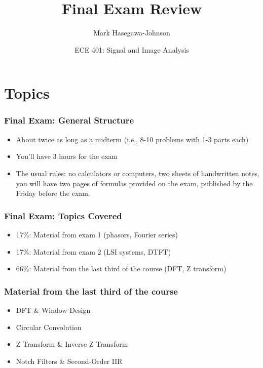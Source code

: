 \documentclass{beamer}
\title{Final Exam Review}
\author{Mark Hasegawa-Johnson}
\date{ECE 401: Signal and Image Analysis}
\begin{document}
\begin{frame}
  \maketitle
\end{frame}

\begin{frame}
  \tableofcontents
\end{frame}


\section{Topics}
\setcounter{subsection}{1}

\begin{frame}
  \frametitle{Final Exam: General Structure}

  \begin{itemize}
  \item About twice as long as a midterm (i.e., 8-10 problems with 1-3 parts each)
  \item You'll have 3 hours for the exam
  \item The usual rules: no calculators or computers, two sheets of
    handwritten notes, you will have two pages of formulas provided on
    the exam, published by the Friday before the exam.  
  \end{itemize}
\end{frame}

\begin{frame}
  \frametitle{Final Exam: Topics Covered}

  \begin{itemize}
  \item 17\%: Material from exam 1 (phasors, Fourier series)
  \item 17\%: Material from exam 2 (LSI systems, DTFT)
  \item 66\%: Material from the last third of the course (DFT, Z transform)
  \end{itemize}
\end{frame}

\begin{frame}
  \frametitle{Material from the last third of the course}

  \begin{itemize}
  \item DFT \& Window Design
  \item Circular Convolution
  \item Z Transform \& Inverse Z Transform
  \item Notch Filters \& Second-Order IIR
  \end{itemize}
\end{frame}
\end{document}
